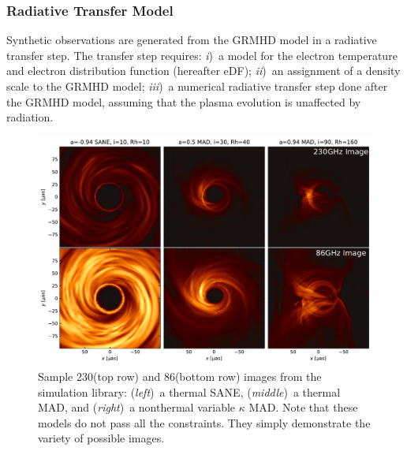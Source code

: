 \subsubsection{Radiative Transfer Model}

Synthetic observations are generated from the GRMHD model in a radiative transfer step.
The transfer step requires: %
\emph{i})~a model for the electron temperature and electron distribution function (hereafter eDF);
\emph{ii})~an assignment of a density scale to the GRMHD model;
\emph{iii})~a numerical radiative transfer step done after the GRMHD model, assuming that the plasma evolution is unaffected by radiation.

\begin{figure}
  \centering
  \includegraphics[width=\textwidth]{figures/sample_imgs.pdf}
  \caption{Sample 230\GHz (top row) and 86\GHz (bottom row) images
    from the simulation library:
    (\emph{left})~a thermal SANE,
    (\emph{middle})~a thermal MAD, and
    (\emph{right})~a nonthermal variable $\kappa$ MAD.
    Note that these models do not pass all the constraints.
    They simply demonstrate the variety of possible images.}
  \label{fig:sample_imgs}
\end{figure}

\label{sec:eDF}

